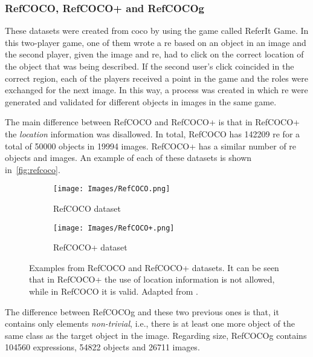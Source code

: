 \subsubsection{RefCOCO, RefCOCO+ and RefCOCOg}

These datasets were created from \gls{coco} by 
using the game called ReferIt Game. In this two-player game, one of them wrote
a \gls{re} based on an object in an image and the second player, given the
image and \gls{re}, had to click on the correct location of the object that was
being described. If the second user's click coincided in the correct region,
each of the players received a point in the game and the roles were exchanged
for the next image. In this way, a process was created in which \gls{re} were
generated and validated for different objects in images in the same game.

The main difference between RefCOCO and RefCOCO+ is that in RefCOCO+ the
\emph{location} information was disallowed. In total, RefCOCO has \num{142209}
\gls{re} for a total of \num{50000} objects in \num{19994} images. RefCOCO+ has
a similar number of \gls{re} objects and images. An example of each of these
datasets is shown in\ \vref{fig:refcoco}.

\begin{figure}[ht]
  \centering
  \begin{subfigure}[t]{.45\textwidth}
    \centering
    \caption{RefCOCO dataset}
    \texttt{[image: Images/RefCOCO.png]}
  \end{subfigure}
  \begin{subfigure}[t]{.45\textwidth}
    \centering
    \caption{RefCOCO+ dataset}
    \texttt{[image: Images/RefCOCO+.png]}
  \end{subfigure}
  \caption[Examples from RefCOCO and RefCOCO+ datasets]{Examples from RefCOCO
    and RefCOCO+ datasets. It can be seen that in RefCOCO+ the use of location
    information is not allowed, while in RefCOCO it is valid. Adapted from
    .}%
  \label{fig:refcoco}
\end{figure}

The difference between RefCOCOg and these two previous ones is that, it
contains only elements \emph{non-trivial}, i.e., there is at least one more
object of the same class as the target object in the image. Regarding size,
RefCOCOg contains \num{104560} expressions, \num{54822} objects and \num{26711}
images.


